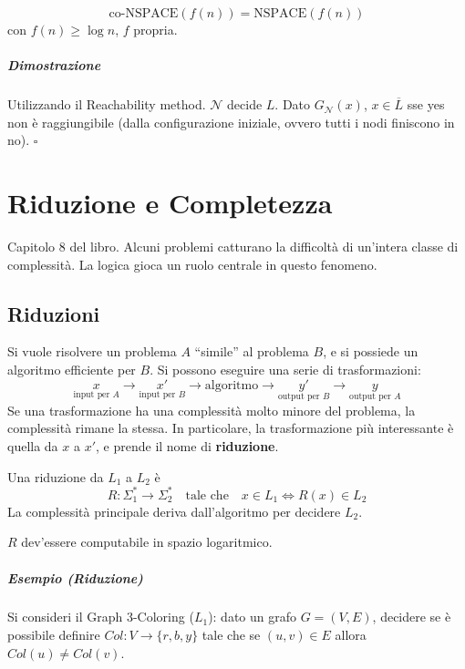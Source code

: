 \begin{corollary}
    $$
        \text{co-NSPACE}(f(n)) = \text{NSPACE}(f(n))
    $$
    con $f(n)\geq\log n$, $f$ propria.
\end{corollary}
\paragraph{Dimostrazione} Utilizzando il Reachability method. $\mathcal{N}$ decide $L$. Dato $G_\mathcal{N}(x)$, $x\in\overline{L}$ sse yes non è raggiungibile (dalla configurazione iniziale, ovvero tutti i nodi finiscono in no). \hfill$\square$




\chapter{Riduzione e Completezza}
Capitolo 8 del libro. Alcuni problemi catturano la difficoltà di un'intera classe di complessità. La logica gioca un ruolo centrale in questo fenomeno.


\section{Riduzioni}
Si vuole risolvere un problema $A$ ``simile'' al problema $B$, e si possiede un algoritmo efficiente per $B$. Si possono eseguire una serie di trasformazioni:
$$
    \underset{\text{input per }A}{x} \to \underset{\text{input per }B}{x'} \to \text{algoritmo} \to \underset{\text{output per }B}{y'} \to \underset{\text{output per }A}{y}
$$
Se una trasformazione ha una complessità molto minore del problema, la complessità rimane la stessa. In particolare, la trasformazione più interessante è quella da $x$ a $x'$, e prende il nome di \textbf{riduzione}.
\begin{definition}[Riduzione]
    Una riduzione da $L_1$ a $L_2$ è
    $$
        R:\Sigma_1^*\to\Sigma_2^* \text{ ~ tale che ~ } x\in L_1 \Leftrightarrow R(x)\in L_2
    $$
    La complessità principale deriva dall'algoritmo per decidere $L_2$.
\end{definition}
$R$ dev'essere computabile in spazio logaritmico.

\paragraph{Esempio (Riduzione)} Si consideri il Graph 3-Coloring ($L_1$): dato un grafo $G=(V,E)$, decidere se è possibile definire $Col:V\to\{r,b,y\}$ tale che se $(u,v)\in E$ allora $Col(u)\neq Col(v)$.

